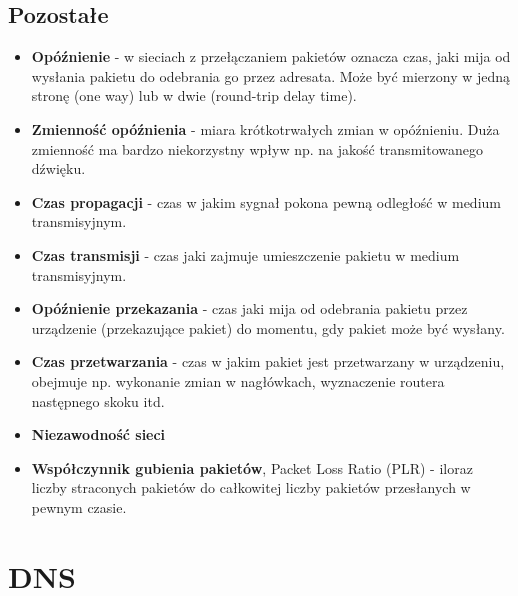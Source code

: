 \documentclass[a4paper]{article}
\begin{document}
\subsection{Pozostałe}
\begin{itemize}
    \item \textbf{Opóźnienie} - w sieciach z przełączaniem pakietów oznacza czas, jaki
mija od wysłania pakietu do odebrania go przez adresata. Może być mierzony w jedną stronę
(one way) lub w dwie (round-trip delay time).
    \item \textbf{Zmienność opóźnienia} - miara krótkotrwałych zmian w opóźnieniu.
Duża zmienność ma bardzo niekorzystny wpływ np. na jakość transmitowanego dźwięku.
    \item \textbf{Czas propagacji} - czas w jakim sygnał pokona pewną odległość w
    medium transmisyjnym.
    \item \textbf{Czas transmisji} - czas jaki zajmuje umieszczenie pakietu w
medium transmisyjnym.
    \item \textbf{Opóźnienie przekazania} - czas jaki mija od odebrania pakietu
przez urządzenie (przekazujące pakiet) do momentu, gdy pakiet może być wysłany.
    \item \textbf{Czas przetwarzania} - czas w jakim pakiet jest przetwarzany w
urządzeniu, obejmuje np. wykonanie zmian w nagłówkach, wyznaczenie routera następnego
skoku itd.
    \item \textbf{Niezawodność sieci}
    \item \textbf{Współczynnik gubienia pakietów}, Packet Loss Ratio (PLR) - iloraz liczby straconych
pakietów do całkowitej liczby pakietów przesłanych w pewnym czasie.
\end{itemize}

\section{DNS}
\end{document}
